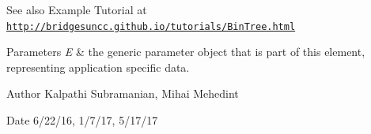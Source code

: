 \begin{DoxySeeAlso}{See also}
Example Tutorial at \href{http://bridgesuncc.github.io/tutorials/BinTree.html}{\tt http\+://bridgesuncc.\+github.\+io/tutorials/\+Bin\+Tree.\+html}
\end{DoxySeeAlso}

\begin{DoxyParams}{Parameters}
{\em E} & the generic parameter object that is part of this element, representing application specific data.\\
\hline
\end{DoxyParams}
\begin{DoxyAuthor}{Author}
Kalpathi Subramanian, Mihai Mehedint
\end{DoxyAuthor}
\begin{DoxyDate}{Date}
6/22/16, 1/7/17, 5/17/17 
\end{DoxyDate}
